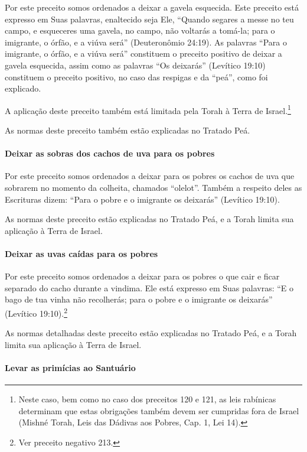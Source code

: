 Por este preceito somos ordenados a deixar a gavela esquecida. Este
preceito está expresso em Suas palavras, enaltecido seja Ele, ``Quando
segares a messe no teu campo, e esqueceres uma gavela, no campo, não
voltarás a tomá-la; para o imigrante, o órfão, e a viúva será''
(Deuteronômio 24:19). As palavras ``Para o imigrante, o órfão, e a viúva
será'' constituem o preceito positivo de
deixar a gavela esquecida, assim como as palavras ``Os deixarás''
(Levítico 19:10) constituem o preceito positivo, no caso das respigas e da ``peá'', como
foi explicado.

A aplicação deste preceito também está limitada pela Torah à Terra de Israel.\footnote{Neste caso, bem como no caso dos preceitos 120 e 121, as leis
  rabínicas determinam que estas obrigações também devem ser cumpridas
  fora de Israel (Mishné Torah, Leis das Dádivas aos Pobres, Cap. 1,
  Lei 14).}

As normas deste preceito também estão explicadas no Tratado Peá.

\paragraph{Deixar as sobras dos cachos de uva para os pobres}

Por este preceito somos ordenados a deixar para os pobres os cachos de
uva que sobrarem no momento da colheita, chamados ``olelot''. Também a
respeito deles as Escrituras dizem: ``Para o pobre e o imigrante os
deixarás'' (Levítico 19:10).

As normas deste preceito estão explicadas no Tratado Peá, e a Torah
limita sua aplicação à Terra de Israel.

\paragraph{Deixar as uvas caídas para os pobres}

Por este preceito somos ordenados a deixar para os pobres o que cair e
ficar separado do cacho durante a vindima. Ele está expresso em Suas
palavras: ``E o bago de tua vinha não recolherás; para o pobre e o
imigrante os deixarás'' (Levítico 19:10).\footnote{Ver preceito negativo 213.}

As normas detalhadas deste preceito estão explicadas no Tratado Peá, e a
Torah limita sua aplicação à Terra de Israel.

\paragraph{Levar as primícias ao Santuário}

